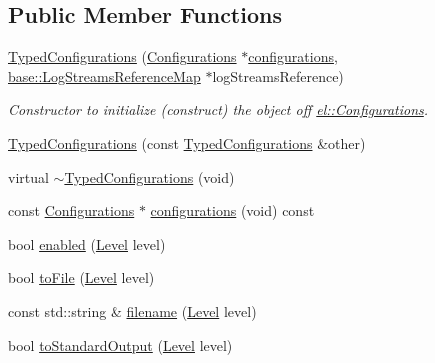 \subsection*{Public Member Functions}
\begin{DoxyCompactItemize}
\item 
\hyperlink{classel_1_1base_1_1_typed_configurations_a1b6d90479bb79da27c3e351a9be593ae}{Typed\+Configurations} (\hyperlink{classel_1_1_configurations}{Configurations} $\ast$\hyperlink{classel_1_1base_1_1_typed_configurations_a65d2ec91ff7edc07db304ebd9c30291f}{configurations}, \hyperlink{namespaceel_1_1base_af7602da9fe1d6c75985184fb0e39fd11}{base\+::\+Log\+Streams\+Reference\+Map} $\ast$log\+Streams\+Reference)
\begin{DoxyCompactList}\small\item\em Constructor to initialize (construct) the object off \hyperlink{classel_1_1_configurations}{el\+::\+Configurations}. \end{DoxyCompactList}\item 
\hyperlink{classel_1_1base_1_1_typed_configurations_ae7b346e5d32305d4957bc6c564409090}{Typed\+Configurations} (const \hyperlink{classel_1_1base_1_1_typed_configurations}{Typed\+Configurations} \&other)
\item 
virtual \hyperlink{classel_1_1base_1_1_typed_configurations_a43106121731b69829ad9f6d6035b1e0b}{$\sim$\+Typed\+Configurations} (void)
\item 
const \hyperlink{classel_1_1_configurations}{Configurations} $\ast$ \hyperlink{classel_1_1base_1_1_typed_configurations_a65d2ec91ff7edc07db304ebd9c30291f}{configurations} (void) const 
\item 
bool \hyperlink{classel_1_1base_1_1_typed_configurations_a924b35df988103c737907cc7993c3c1c}{enabled} (\hyperlink{namespaceel_ab0ac6091262344c52dd2d3ad099e8e36}{Level} level)
\item 
bool \hyperlink{classel_1_1base_1_1_typed_configurations_a20b9a1bd152cad3b72b558f97de3876b}{to\+File} (\hyperlink{namespaceel_ab0ac6091262344c52dd2d3ad099e8e36}{Level} level)
\item 
const std\+::string \& \hyperlink{classel_1_1base_1_1_typed_configurations_a6a7871c0c37c3306334e90dfdc1d2e47}{filename} (\hyperlink{namespaceel_ab0ac6091262344c52dd2d3ad099e8e36}{Level} level)
\item 
bool \hyperlink{classel_1_1base_1_1_typed_configurations_aeaa7bf7448319bc41e4e226124288c7e}{to\+Standard\+Output} (\hyperlink{namespaceel_ab0ac6091262344c52dd2d3ad099e8e36}{Level} level)
\item 

\end{DoxyCompactItemize}

